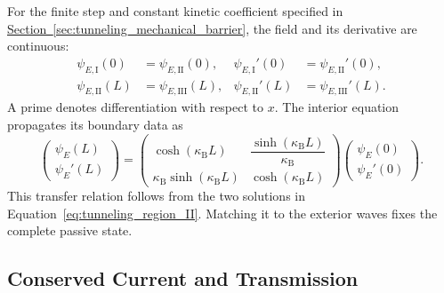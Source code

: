 For the finite step and constant kinetic coefficient specified in \hyperref[sec:tunneling_mechanical_barrier]{Section~\ref*{sec:tunneling_mechanical_barrier}}, the field and its derivative are continuous:
\begin{align}
    \psi_{E,\mathrm I}(0)&=\psi_{E,\mathrm{II}}(0),
    &\psi_{E,\mathrm I}'(0)&=\psi_{E,\mathrm{II}}'(0),\\
    \psi_{E,\mathrm{II}}(L)&=\psi_{E,\mathrm{III}}(L),
    &\psi_{E,\mathrm{II}}'(L)&=\psi_{E,\mathrm{III}}'(L).
\end{align}
A prime denotes differentiation with respect to $x$. The interior equation propagates its boundary data as
\begin{equation}
    \begin{pmatrix}
        \psi_E(L)\\[1mm]\psi_E'(L)
    \end{pmatrix}
    =
    \begin{pmatrix}
        \cosh(\kappa_{\mathrm B}L)
        &\dfrac{\sinh(\kappa_{\mathrm B}L)}{\kappa_{\mathrm B}}
        \\[2mm]
        \kappa_{\mathrm B}\sinh(\kappa_{\mathrm B}L)
        &\cosh(\kappa_{\mathrm B}L)
    \end{pmatrix}
    \begin{pmatrix}
        \psi_E(0)\\[1mm]\psi_E'(0)
    \end{pmatrix}.
\end{equation}
This transfer relation follows from the two solutions in Equation~\eqref{eq:tunneling_region_II}. Matching it to the exterior waves fixes the complete passive state.

\subsection{Conserved Current and Transmission}

